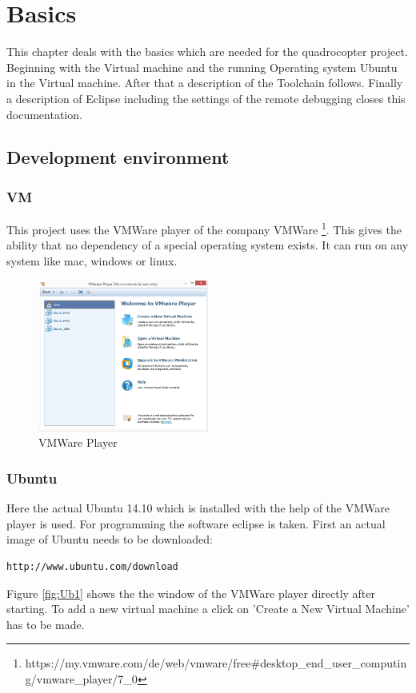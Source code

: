 \chapter{Basics}
\label{chap:ch-Ba}

This chapter deals with the basics which are needed for the quadrocopter project. Beginning with the Virtual machine and the running Operating system Ubuntu in the Virtual machine. After that a description of the Toolchain follows. Finally a description of Eclipse including the settings of the remote debugging closes this documentation.

\section{Development environment}
\label{sec:ch-PrEn}

\subsection{VM}
\label{subsec:sec-VM}

This project uses the VMWare player of the company VMWare \footnote{https://my.vmware.com/de/web/vmware/free\#desktop\_end\_user\_computing/vmware\_player/7\_0}. This gives the ability that no dependency of a special operating system exists. It can run on any system like mac, windows or linux.

\begin{figure}[H]
	\centering\includegraphics[width=0.5\textwidth]{fig/VMPlayer.jpg}
	\caption{VMWare Player}
	\label{fig:VMPlayer}
\end{figure}

\subsection{Ubuntu}
\label{subsec:sec-Ub}

Here the actual Ubuntu 14.10 which is installed with the help of the VMWare player is used. For programming the software eclipse is taken. First an actual image of Ubuntu needs to be downloaded:
\begin{lstlisting}
http://www.ubuntu.com/download
\end{lstlisting}
Figure \ref{fig:Ub1} shows the the window of the VMWare player directly after starting. To add a new virtual machine a click on 'Create a New Virtual Machine' has to be made.

